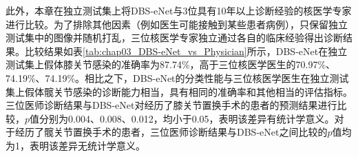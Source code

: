 \begin{table}[htbp]
  \centering
  \caption{DBS-eNet在独立测试集上与三名专业核医学医生之间的比较}
  \label{tab:chap03_DBS-eNet_vs_Physician}
\end{table}

此外，本章在独立测试集上将DBS-eNet与3位具有10年以上诊断经验的核医学专家进行比较。为了排除其他因素（例如医生可能接触到某些患者病例），只保留独立测试集中的图像并随机打乱，三位核医学专家独立通过各自的临床经验得出诊断结果。比较结果如表\ref{tab:chap03_DBS-eNet_vs_Physician}所示，DBS-eNet在独立测试集上假体膝关节感染的准确率为87.74\%，高于三位核医学医生的70.97\%、74.19\%、74.19\%。相比之下，DBS-eNet的分类性能与三位核医学医生在独立测试集上假体髋关节感染的诊断能力相当，具有相同的准确率和其他相当的评估指标。三位医师诊断结果与DBS-eNet对经历了膝关节置换手术的患者的预测结果进行比较，\(p\)值分别为0.004、0.008、0.012，均小于0.05，表明该差异有统计学意义。对于经历了髋关节置换手术的患者，三位医师诊断结果与DBS-eNet之间比较的\(p\)值均为1，表明该差异无统计学意义。

